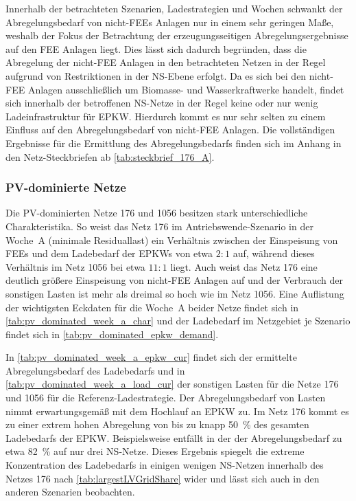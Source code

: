 Innerhalb der betrachteten Szenarien, Ladestrategien und Wochen schwankt der Abregelungsbedarf von nicht-\glspl{FEE} Anlagen nur in einem sehr geringen Maße, weshalb der Fokus der Betrachtung der erzeugungsseitigen Abregelungsergebnisse auf den \gls{FEE} Anlagen liegt.
Dies lässt sich dadurch begründen, dass die Abregelung der nicht-\gls{FEE} Anlagen in den betrachteten Netzen in der Regel aufgrund von Restriktionen in der \gls{NS}-Ebene erfolgt.
Da es sich bei den nicht-\gls{FEE} Anlagen ausschließlich um Biomasse- und Wasserkraftwerke handelt, findet sich innerhalb der betroffenen \gls{NS}-Netze in der Regel keine oder nur wenig Ladeinfrastruktur für \gls{EPKW}.
Hierdurch kommt es nur sehr selten zu einem Einfluss auf den Abregelungsbedarf von nicht-\gls{FEE} Anlagen.
Die vollständigen Ergebnisse für die Ermittlung des Abregelungsbedarfs finden sich im Anhang in den Netz-Steckbriefen ab \autoref{tab:steckbrief_176_A}.


\subsubsection{PV-dominierte Netze}

Die \gls{PV}-dominierten Netze \num{176} und \num{1056} besitzen stark unterschiedliche Charakteristika.
So weist das Netz \num{176} im Antriebswende-Szenario in der Woche~A (minimale Residuallast) ein Verhältnis zwischen der Einspeisung von \glspl{FEE} und dem Ladebedarf der \glspl{EPKW} von etwa \(2:1\) auf, während dieses Verhältnis im Netz \num{1056} bei etwa \(11:1\) liegt.
Auch weist das Netz \num{176} eine deutlich größere Einspeisung von nicht-\gls{FEE} Anlagen auf und der Verbrauch der sonstigen Lasten ist mehr als dreimal so hoch wie im Netz \num{1056}.
Eine Auflistung der wichtigsten Eckdaten für die Woche~A beider Netze findet sich in \autoref{tab:pv_dominated_week_a_char} und der Ladebedarf im Netzgebiet je Szenario findet sich in \autoref{tab:pv_dominated_epkw_demand}.





In \autoref{tab:pv_dominated_week_a_epkw_cur} findet sich der ermittelte Abregelungsbedarf des Ladebedarfs und in \autoref{tab:pv_dominated_week_a_load_cur} der sonstigen Lasten für die Netze \num{176} und \num{1056} für die Referenz-Ladestrategie.
Der Abregelungsbedarf von Lasten nimmt erwartungsgemäß mit dem Hochlauf an \gls{EPKW} zu.
Im Netz \num{176} kommt es zu einer extrem hohen Abregelung von bis zu knapp \SI{50}{\percent} des gesamten Ladebedarfs der \gls{EPKW}.
Beispielsweise entfällt in der \SzeFirmenparkplatz der Abregelungsbedarf zu etwa \SI{82}{\percent} auf nur drei \gls{NS}-Netze.
Dieses Ergebnis spiegelt die extreme Konzentration des Ladebedarfs in einigen wenigen \gls{NS}-Netzen innerhalb des Netzes \num{176} nach \autoref{tab:largestLVGridShare} wider und lässt sich auch in den anderen Szenarien beobachten.

